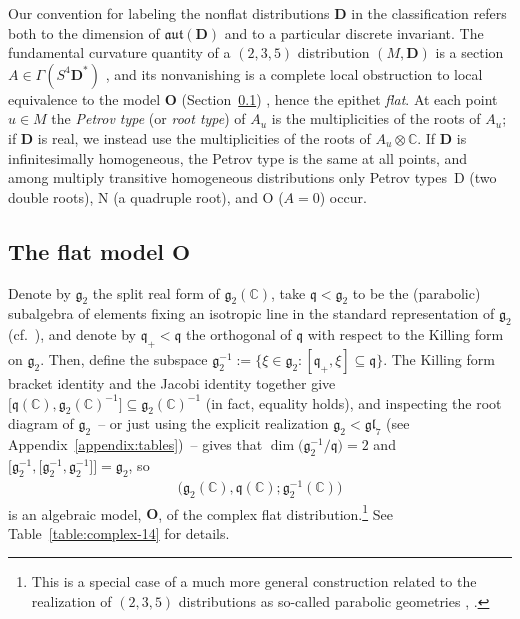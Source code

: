 \documentclass[pdftex]{sigma}
\newcommand{\bbC}{\mathbb{C}}
\newcommand{\mbD}{\mathbf{D}}
\newcommand{\mbO}{\mathbf{O}}
\newcommand{\mfg} {\mathfrak{g}}
\newcommand{\mfq} {\mathfrak{q}}
\newcommand{\mfaut}{\mathfrak{aut}}
\newcommand{\mfgl} {\mathfrak{gl}}
\numberwithin{equation}{section}
\begin{document}
\begin{Remark}\label{remark:labeling}Our convention for labeling the nonflat distributions $\mbD$ in the classification refers both to the dimension of $\mfaut(\mbD)$ and to a particular discrete invariant. The fundamental curvature quantity of a $(2, 3, 5)$ distribution $(M, \mbD)$ is a section $A \in \Gamma(S^4 \mbD^*)$ \cite[Section~33]{CartanFiveVariables}, and its nonvanishing is a complete local obstruction to local equivalence to the model $\mbO$ (Section~\ref{subsection:O}) \cite[Sections~36--39]{CartanFiveVariables}, hence the epithet \textit{flat}. At each point $u \in M$ the \textit{Petrov type} (or \textit{root type}) of $A_u$ is the multiplicities of the roots of $A_u$; if $\mbD$ is real, we instead use the multiplicities of the roots of $A_u \otimes \bbC$. If $\mbD$ is infinitesimally homogeneous, the Petrov type is the same at all points, and among multiply transitive homogeneous distributions only Petrov types~D (two double roots), N (a quadruple root), and O ($A = 0$) occur.
\end{Remark}

\subsection[The flat model $\mbO$]{The flat model $\boldsymbol{\mbO}$}\label{subsection:O}
Denote by $\mfg_2$ the split real form of $\mfg_2(\bbC)$, take $\mfq < \mfg_2$ to be the (parabolic) subalgebra of elements fixing an isotropic line in the standard representation of $\mfg_2$ (cf.\ \cite[Section~4]{BorMontgomery}), and denote by $\mfq_+ < \mfq$ the orthogonal of $\mfq$ with respect to the Killing form on $\mfg_2$. Then, define the subspace $\mfg_2^{-1} := \{ \xi \in \mfg_2 \colon [\mfq_+ , \xi] \subseteq \mfq \}$. The Killing form bracket identity and the Jacobi identity together give $\big[\mfq(\bbC), \mfg_2(\bbC)^{-1}\big] \subseteq \mfg_2(\bbC)^{-1}$ (in fact, equality holds), and inspecting the root diagram of $\mfg_2$~-- or just using the explicit realization $\mfg_2 < \mfgl_7$ (see Appendix~\ref{appendix:tables})~-- gives that $\dim \big(\mfg_2^{-1} / \mfq\big) = 2$ and $\big[\mfg_2^{-1}, \big[\mfg_2^{-1}, \mfg_2^{-1}\big]\big] = \mfg_2$, so
\begin{gather*}
	\boxed{\big(\mfg_2(\bbC), \mfq(\bbC); \mfg_2^{-1}(\bbC)\big)}
\end{gather*}
is an algebraic model, $\mbO$, of the complex flat distribution.\footnote{This is a special case of a much more general construction \cite[Section~3]{CapSlovak} related to the realization of $(2, 3, 5)$ distributions as so-called parabolic geometries \cite[Section~4.3.2]{CapSlovak}, \cite{Sagerschnig}.} See Table~\ref{table:complex-14} for details.
\end{document}
